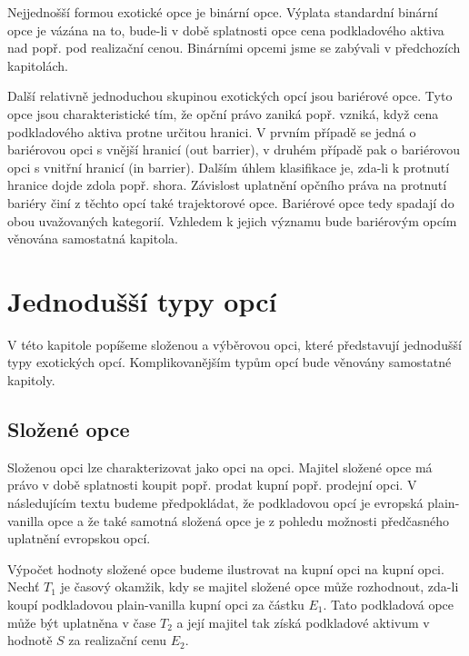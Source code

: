 \documentclass[a4paper]{book}
\begin{document}
Nejjednošší formou exotické opce je binární opce. Výplata standardní binární opce je vázána na to, bude-li v době splatnosti opce cena podkladového aktiva nad popř. pod realizační cenou. Binárními opcemi jsme se zabývali v předchozích kapitolách.

Další relativně jednoduchou skupinou exotických opcí jsou bariérové opce. Tyto opce jsou charakteristické tím, že opční právo zaniká popř. vzniká, když cena podkladového aktiva protne určitou hranici. V prvním případě se jedná o bariérovou opci s vnější hranicí (out barrier), v druhém případě pak o bariérovou opci s vnitřní hranicí (in barrier). Dalším úhlem klasifikace je, zda-li k protnutí hranice dojde zdola popř. shora. Závislost uplatnění opčního práva na protnutí bariéry činí z těchto opcí také trajektorové opce. Bariérové opce tedy spadají do obou uvažovaných kategorií. Vzhledem k jejich významu bude bariérovým opcím věnována samostatná kapitola.

\section{Jednodušší typy opcí}

V této kapitole popíšeme složenou a výběrovou opci, které představují jednodušší typy exotických opcí. Komplikovanějším typům opcí bude věnovány samostatné kapitoly.

\subsection{Složené opce}

Složenou opci lze charakterizovat jako opci na opci. Majitel složené opce má právo v době splatnosti koupit popř. prodat kupní popř. prodejní opci. V následujícím textu budeme předpokládat, že podkladovou opcí je evropská plain-vanilla opce a že také samotná složená opce je z pohledu možnosti předčasného uplatnění evropskou opcí.

Výpočet hodnoty složené opce budeme ilustrovat na kupní opci na kupní opci. Nechť $T_1$ je časový okamžik, kdy se majitel složené opce může rozhodnout, zda-li koupí podkladovou plain-vanilla kupní opci za částku $E_1$. Tato podkladová opce může být uplatněna v čase $T_2$ a její majitel tak získá podkladové aktivum v hodnotě $S$ za realizační cenu $E_2$.
\end{document}

